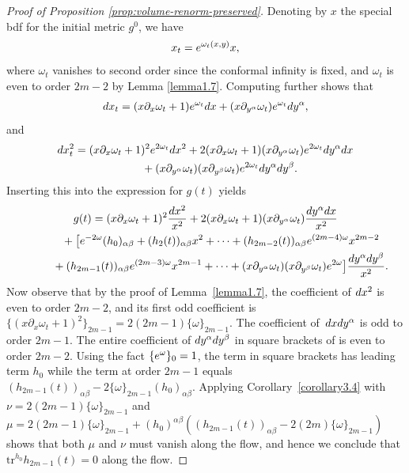 \documentclass[11pt]{article}
\numberwithin{equation}{section}
\newcommand{\gin}{{g^0}}
\newcommand{\tr}{\mathrm{tr}}
\begin{document}
\begin{proof}[Proof of Proposition \ref{prop:volume-renorm-preserved}]
Denoting by $x$ the special bdf for the initial metric $\gin$, we have
\begin{gather*}%
x_t = {\rm e}^{\omega_t(x,y)} x,
\end{gather*}
where $\omega_t$ vanishes to second order since the conformal infinity is fixed, and $\omega_t$ is even to order $2m-2$ by Lemma \ref{lemma1.7}.
Computing further shows that
\begin{gather*}%
{\rm d}x_t = (x\partial_x \omega_t + 1) {\rm e}^{\omega_t} {\rm d}x + (x \partial_{y^{\alpha}} \omega_t) {\rm e}^{\omega_t} {\rm d}y^{\alpha} ,
\end{gather*}
and
\begin{gather*}%
{\rm d}x_t^2 = (x\partial_x \omega_t + 1)^2 {\rm e}^{2\omega_t} {\rm d}x^2 + 2(x\partial_x \omega_t + 1) (x \partial_{y^{\alpha}} \omega_t)
{\rm e}^{2\omega_t} {\rm d}y^{\alpha} {\rm d}x\\
\hphantom{{\rm d}x_t^2 =}{} + (x \partial_{y^{\alpha}} \omega_t) (x \partial_{y^{\beta}} \omega_t) {\rm e}^{2\omega_t} {\rm d}y^{\alpha} {\rm d}y^{\beta}.
\end{gather*}
Inserting this into the expression for $g(t)$ yields
\begin{gather*}%
g(t) = ( x\partial_x \omega_t + 1)^2 \frac{{\rm d}x^2}{x^2} + 2( x\partial_x \omega_t + 1)( x \partial_{y^{\alpha}} \omega_t) \frac{{\rm d}y^{\alpha} {\rm d}x}{x^2} \\
\hphantom{g(t) =}{} + \big[ {\rm e}^{-2\omega} (h_0)_{\alpha \beta} + (h_2(t))_{\alpha \beta} x^2 + \cdots + (h_{2m-2}(t))_{\alpha \beta} {\rm e}^{(2m-4)\omega} x^{2m-2}\\
\hphantom{g(t) =}{} + (h_{2m-1}(t))_{\alpha \beta} {\rm e}^{(2m-3)\omega} x^{2m-1} + \cdots + (x \partial_{y^{\alpha}} \omega_t) (x \partial_{y^{\beta}} \omega_t) {\rm e}^{2\omega} \big] \frac{{\rm d}y^{\alpha} {\rm d}y^{\beta}}{x^2} .
\end{gather*}
Now observe that by the proof of Lemma~\ref{lemma1.7}, the coefficient of ${\rm d}x^2$ is even to order $2m-2$, and its first odd coefficient is $
\big\{ ( x\partial_x \omega_t + 1)^2 \big\}_{2m-1} = 2 (2m-1) \{\omega\}_{2m-1}$. The coefficient of~${\rm d}x {\rm d}y^{\alpha}$ is odd to order $2m-1$. The entire coefficient of ${\rm d}y^{\alpha} {\rm d}y^{\beta}$ in square brackets of is even to order $2m-2$. Using the fact $\{{\rm e}^{\omega}\}_0 = 1$, the term in square brackets has leading term $h_0$ while the term at order $2m-1$ equals $(h_{2m-1}(t))_{\alpha \beta} - 2 \{\omega\}_{2m-1}(h_0)_{\alpha \beta}$. Applying Corollary~\ref{corollary3.4} with $\nu = 2(2m-1) \{\omega\}_{2m-1}$ and $\mu = 2(2m-1) \{\omega\}_{2m-1} + (h_0)^{\alpha \beta}( (h_{2m-1}(t))_{\alpha \beta} - 2(2m)\{\omega\}_{2m-1}) $ shows that both $\mu$ and $\nu$ must vanish along the flow, and hence we conclude that $\tr^{h_0} h_{2m-1}(t) = 0$ along the flow.
\end{proof}
\end{document}
